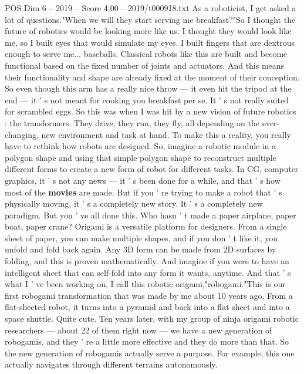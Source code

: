 \begin{textsample}{POS Dim 6 – 2019 – Score 4.00 – 2019/t000918.txt}  \label{ex:f6_pos_064}
As a roboticist, I get asked a lot of questions."When we will they start serving me breakfast?"So I thought the future of robotics would be looking more like us.
I thought they would look like me, so I built eyes that would simulate my eyes.
I built fingers that are dextrous enough to serve me... baseballs.
Classical robots like this are built and become functional based on the fixed number of joints and actuators.
And this means their functionality and shape are already fixed at the moment of their conception.
So even though this arm has a really nice throw — it even hit the tripod at the end — it ' s not meant for cooking you breakfast per se.
It ' s not really suited for scrambled eggs.
So this was when I was hit by a new vision of future robotics : the transformers.
They drive, they run, they fly, all depending on the ever- changing, new environment and task at hand.
To make this a reality, you really have to rethink how robots are designed.
So, imagine a robotic module in a polygon shape and using that simple polygon shape to reconstruct multiple different forms to create a new form of robot for different tasks.
In CG, computer graphics, it ' s not any news — it ' s been done for a while, and that ' s how most of the \textbf{movies} are made.
But if you ' re trying to make a robot that ' s physically moving, it ' s a completely new story.
It ' s a completely new paradigm.
But you ' ve all done this.
Who hasn ' t made a paper airplane, paper boat, paper crane?
Origami is a versatile platform for designers.
From a single sheet of paper, you can make multiple shapes, and if you don ' t like it, you unfold and fold back again.
Any 3D form can be made from 2D surfaces by folding, and this is proven mathematically.
And imagine if you were to have an intelligent sheet that can self-fold into any form it wants, anytime.
And that ' s what I ' ve been working on.
I call this robotic origami,"robogami."This is our first robogami transformation that was made by me about 10 years ago.
From a flat-sheeted robot, it turns into a pyramid and back into a flat sheet and into a space shuttle.
Quite cute.
Ten years later, with my group of ninja origami robotic researchers — about 22 of them right now — we have a new generation of robogamis, and they ' re a little more effective and they do more than that.
So the new generation of robogamis actually serve a purpose.
For example, this one actually navigates through different terrains autonomously.

\end{textsample}
